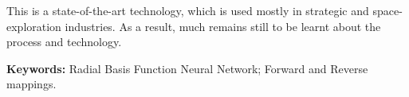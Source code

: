 This is a state-of-the-art technology, 
which is used  mostly in strategic and 
space-exploration industries. As a result, much remains still to be 
learnt about the process and technology. 

{\bf Keywords:} Radial Basis Function Neural Network; Forward and Reverse mappings.
